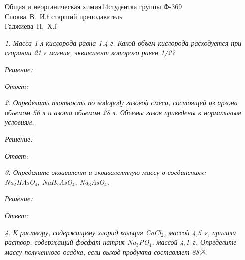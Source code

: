 




\newcommand{\bi}[1]{\( _{#1} \)}
\renewcommand{\.}{\;\!}



{Общая и неорганическая химия}{}{14}{студентка группы Ф-369\\Слоква~В.~И.}{f}
{старший преподаватель\\Гаджиева~Н.~Х.}{f}


\emph{1. Масса 1 л кислорода равна 1,4 г. Какой объем кислорода расходуется при
сгорании 21 г магния, эквивалент которого равен 1\!/2?}

\vspace*{2em}
\emph{Решение:}

\vspace*{2em}
\emph{Ответ: }

\newpage %

\emph{2. Определить плотность по водороду газовой смеси, состоящей из аргона
объемом 56 л и азота объемом 28 л. Объемы газов приведены к нормальным
условиям.}

\vspace*{2em}
\emph{Решение:}

\vspace*{2em}
\emph{Ответ: }

\newpage %

\emph{3. Определите эквивалент и эквивалентную массу в соединениях:\\
Na\bi{2}\.H\.As\.O\bi{4}, Na\.H\bi{2}\.As\.O\bi{4}, Na\bi{3}\.As\.O\bi{4}.}

\vspace*{2em}
\emph{Решение:}

\vspace*{2em}
\emph{Ответ: }

\newpage %

\emph{4. К раствору, содержащему хлорид кальция Ca\.Cl\bi{2}, массой 4,5~г,
прилили раствор, содержащий фосфат натрия Na\bi{3}\.PO\bi{4}, массой 4,1~г.
Определите массу полученного осадка, если выход продукта составляет 88\%.}

